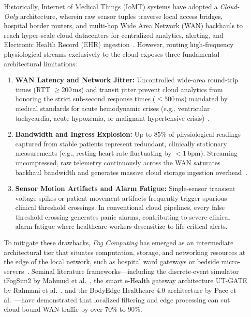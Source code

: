 \documentclass[conference]{IEEEtran}
\begin{document}
Historically, Internet of Medical Things (IoMT) systems have adopted a \textit{Cloud-Only} architecture, wherein raw sensor tuples traverse local access bridges, hospital border routers, and multi-hop Wide Area Network (WAN) backhauls to reach hyper-scale cloud datacenters for centralized analytics, alerting, and Electronic Health Record (EHR) ingestion~\cite{Rahmani2018}. However, routing high-frequency physiological streams exclusively to the cloud exposes three fundamental architectural limitations:
\begin{enumerate}
    \item \textbf{WAN Latency and Network Jitter:} Uncontrolled wide-area round-trip times (RTT $\ge 200$\,ms) and transit jitter prevent cloud analytics from honoring the strict sub-second response times ($\le 500$\,ms) mandated by medical standards for acute hemodynamic crises (e.g., ventricular tachycardia, acute hypoxemia, or malignant hypertensive crisis)~\cite{Rahmani2018,Pace2019}.
    \item \textbf{Bandwidth and Ingress Explosion:} Up to 85\% of physiological readings captured from stable patients represent redundant, clinically stationary measurements (e.g., resting heart rate fluctuating by $< 1$\,bpm). Streaming uncompressed, raw telemetry continuously across the WAN saturates backhaul bandwidth and generates massive cloud storage ingestion overhead~\cite{Pace2019}.
    \item \textbf{Sensor Motion Artifacts and Alarm Fatigue:} Single-sensor transient voltage spikes or patient movement artifacts frequently trigger spurious clinical threshold crossings. In conventional cloud pipelines, every false threshold crossing generates panic alarms, contributing to severe clinical alarm fatigue where healthcare workers desensitize to life-critical alerts.
\end{enumerate}

To mitigate these drawbacks, \textit{Fog Computing} has emerged as an intermediate architectural tier that situates computation, storage, and networking resources at the edge of the local network, such as hospital ward gateways or bedside micro-servers~\cite{Mahmud2022,Rahmani2018,Pace2019}. Seminal literature frameworks---including the discrete-event simulator iFogSim2 by Mahmud et al.~\cite{Mahmud2022}, the smart e-Health gateway architecture UT-GATE by Rahmani et al.~\cite{Rahmani2018}, and the BodyEdge Healthcare 4.0 architecture by Pace et al.~\cite{Pace2019}---have demonstrated that localized filtering and edge processing can cut cloud-bound WAN traffic by over 70\% to 90\%.
\end{document}
